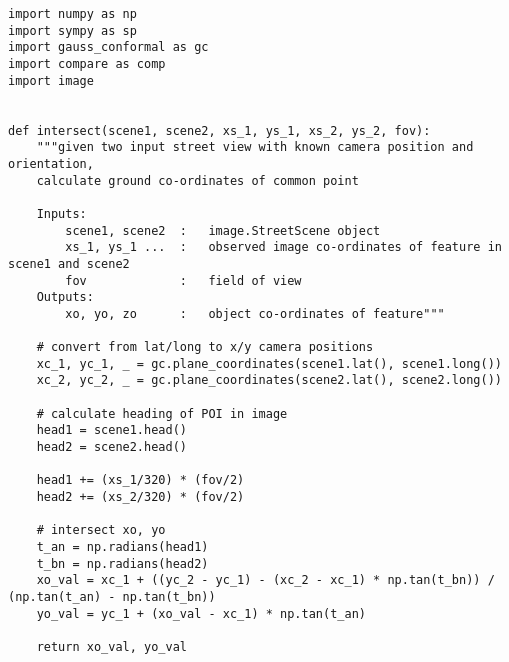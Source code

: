 \begin{lstlisting}
import numpy as np
import sympy as sp
import gauss_conformal as gc
import compare as comp
import image


def intersect(scene1, scene2, xs_1, ys_1, xs_2, ys_2, fov):
    """given two input street view with known camera position and orientation,
    calculate ground co-ordinates of common point

    Inputs:
        scene1, scene2  :   image.StreetScene object
        xs_1, ys_1 ...  :   observed image co-ordinates of feature in scene1 and scene2
        fov             :   field of view
    Outputs:
        xo, yo, zo      :   object co-ordinates of feature"""

    # convert from lat/long to x/y camera positions
    xc_1, yc_1, _ = gc.plane_coordinates(scene1.lat(), scene1.long())
    xc_2, yc_2, _ = gc.plane_coordinates(scene2.lat(), scene2.long())

    # calculate heading of POI in image
    head1 = scene1.head()
    head2 = scene2.head()

    head1 += (xs_1/320) * (fov/2)
    head2 += (xs_2/320) * (fov/2)

    # intersect xo, yo
    t_an = np.radians(head1)
    t_bn = np.radians(head2)
    xo_val = xc_1 + ((yc_2 - yc_1) - (xc_2 - xc_1) * np.tan(t_bn)) / (np.tan(t_an) - np.tan(t_bn))
    yo_val = yc_1 + (xo_val - xc_1) * np.tan(t_an)

    return xo_val, yo_val
\end{lstlisting}